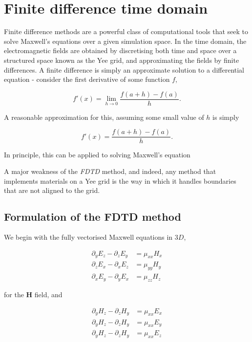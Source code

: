 \chapter{Finite difference time domain}

Finite difference methods are a powerful class of computational tools that seek to solve Maxwell's equations over a given simulation space. In the time domain, the electromagnetic fields are obtained by discretising both time and space over a structured space known as the Yee grid, and approximating the fields by finite differences. A finite difference is simply an approximate solution to a differential equation - consider the first derivative of some function $f$,

\begin{equation}
f'(x) = \lim_{h \rightarrow 0} \dfrac{f(a+h) - f(a)}{h}.
\end{equation}

A reasonable approximation for this, assuming some small value of $h$ is simply

\begin{equation}
f'(x) = \dfrac{f(a+h) - f(a)}{h}.
\end{equation}

In principle, this can be applied to solving Maxwell's equation

A major weakness of the \textit{FDTD} method, and indeed, any method that implements materials on a Yee grid is the way in which it handles boundaries that are not aligned to the grid.

 
\section{Formulation of the FDTD method}

We begin with the fully vectorised Maxwell equations in $3D$,

\begin{align}
\partial_y E_z - \partial_z E_y &= \mu_{xx} H_x \\
\partial_z E_x - \partial_x E_z &= \mu_{yy} H_y \\
\partial_x E_y - \partial_y E_x &= \mu_{zz} H_z 
\end{align}

for the $\bm{H}$ field, and 

\begin{align}
\partial_y H_z - \partial_z H_y &= \mu_{xx} E_x \\
\partial_y H_z - \partial_z H_y &= \mu_{xx} E_y \\
\partial_y H_z - \partial_z H_y &= \mu_{xx} E_z 
\end{align}

